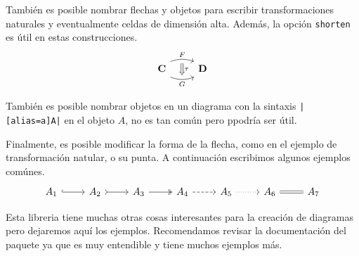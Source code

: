 También es posible nombrar flechas y objetos para escribir transformaciones naturales y eventualmente celdas de dimensión alta. Además, la opción \texttt{shorten} es útil en estas construcciones.
\[
  \begin{tikzcd}
    \mathbf{C}\ar[shift left=2,bend left=20]{r}[name=f]{F}
    \ar[shift right=2,bend right=20]{r}[swap,name=g]{G}
    & \mathbf{D}
    \ar[Rightarrow,from=f,to=g,shorten=1ex]{}{\tau}
  \end{tikzcd}
\]

También es posible nombrar objetos en un diagrama con la sintaxis \verb¡|[alias=a]A|¡ en el objeto \(A\), no es tan común pero ppodría ser útil.

Finalmente, es posible modificar la forma de la flecha, como en el ejemplo de transformación natular, o su punta. A continuación escribimos algunos ejemplos comúnes.
\[
  \begin{tikzcd}
    A_1\ar[hook]{r} & A_2\ar[tail]{r} & A_3\ar[two heads]{r}
    & A_4\ar[dashed]{r} & A_5\ar[dotted]{r} & A_6\ar[equal]{r} & A_7
  \end{tikzcd}
\]

Esta libreria tiene muchas otras cosas interesantes para la creación de
diagramas pero dejaremos aquí los ejemplos. Recomendamos revisar la
documentación del paquete ya que es muy entendible y tiene muchos ejemplos más.
